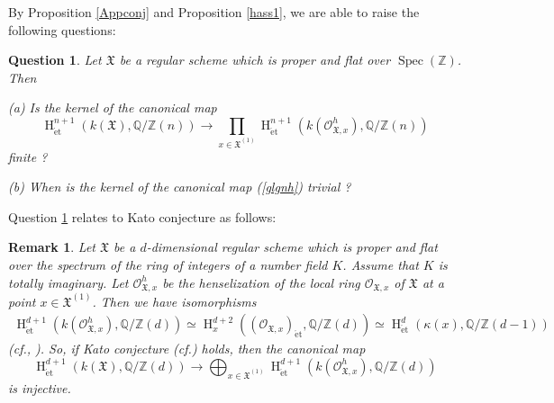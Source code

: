 \documentclass{article}
\newtheorem{rem}[thm]{\indent \sc Remark}
\newtheorem{Qu}[thm]{\indent \sc Question}
\newcommand{\spec}{\operatorname{Spec}}
\newcommand{\et}{\mathrm{\acute{e}t}}
\newcommand{\HO}{\operatorname{H}}
\begin{document}
By Proposition \ref{Appconj} and Proposition \ref{hass1}, 
we are able to raise the following questions:

%
\begin{Qu}\upshape\label{QG}
Let $\mathfrak{X}$ be a regular scheme which is proper and flat
over $\spec(\mathbb{Z})$. Then
%
\begin{description}
\item{(a)} Is the kernel of the canonical map
%
\begin{equation}\label{glgnh}
\HO^{n+1}_{\et}(
k(\mathfrak{X}),
\mathbb{Q}/\mathbb{Z}(n)
)    
\to
\prod_{x\in \mathfrak{X}^{(1)}}
\HO^{n+1}_{\et}(
k(\mathcal{O}_{\mathfrak{X}, x}^{h}),
\mathbb{Q}/\mathbb{Z}(n)
)
\end{equation}
%
finite ?
%
\item{(b)} When is the kernel of the canonical map (\ref{glgnh}) trivial ?
\end{description}
%
\end{Qu}
%

Question \ref{QG} relates to Kato conjecture as follows:

%
\begin{rem}\upshape
Let $\mathfrak{X}$ be a $d$-dimensional regular scheme which 
is proper and flat over 
the spectrum of the ring of integers of a number field $K$. 
Assume that $K$ is totally imaginary. 
Let $\mathcal{O}_{\mathfrak{X}, x}^{h}$ be the henselization of
the local ring $\mathcal{O}_{\mathfrak{X}, x}$ of $\mathfrak{X}$ at 
a point $x\in\mathfrak{X}^{(1)}$.
Then we have isomorphisms
%
\begin{align*}
\HO^{d+1}_{\et}(
k(\mathcal{O}_{\mathfrak{X}, x}^{h}),
\mathbb{Q}/\mathbb{Z}(d)
)    
\simeq 
\HO^{d+2}_{x}(
(\mathcal{O}_{\mathfrak{X}, x})_{\et},
\mathbb{Q}/\mathbb{Z}(d)
)
\simeq 
\HO^{d}_{\et}(
\kappa(x),
\mathbb{Q}/\mathbb{Z}(d-1)
)
\end{align*}
%
(cf.\cite[p.31, Theorem 1.2]{SM}, \cite[Proposition 4.8]{Sak5}). 
So, if Kato conjecture (cf.\cite[p.125, Conjecture 0.3]{K-S}) holds, 
then the canonical map
%
\begin{equation*}
\HO^{d+1}_{\et}(
k(\mathfrak{X}),
\mathbb{Q}/\mathbb{Z}(d)
)    
\to
\displaystyle\bigoplus_{x\in \mathfrak{X}^{(1)}}
\HO^{d+1}_{\et}(
k(\mathcal{O}_{\mathfrak{X}, x}^{h}),
\mathbb{Q}/\mathbb{Z}(d)
)
\end{equation*}
%
is injective. 
\end{rem}
%
\end{document}
